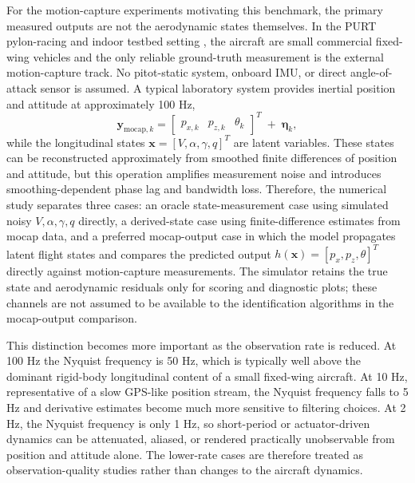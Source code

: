 \documentclass[11pt]{article}
\begin{document}
For the motion-capture experiments motivating this benchmark, the primary measured outputs are not the aerodynamic states themselves. In the PURT pylon-racing and indoor testbed setting \citep{sribunma2026indoor}, the aircraft are small commercial fixed-wing vehicles and the only reliable ground-truth measurement is the external motion-capture track. No pitot-static system, onboard IMU, or direct angle-of-attack sensor is assumed. A typical laboratory system provides inertial position and attitude at approximately 100 Hz,
\[
\mathbf{y}_{\mathrm{mocap},k} =
\begin{bmatrix}
p_{x,k} & p_{z,k} & \theta_k
\end{bmatrix}^{T}
\;+\;
\boldsymbol{\eta}_k,
\]
while the longitudinal states $\mathbf{x}=[V,\alpha,\gamma,q]^T$ are latent variables. These states can be reconstructed approximately from smoothed finite differences of position and attitude, but this operation amplifies measurement noise and introduces smoothing-dependent phase lag and bandwidth loss. Therefore, the numerical study separates three cases: an oracle state-measurement case using simulated noisy $V,\alpha,\gamma,q$ directly, a derived-state case using finite-difference estimates from mocap data, and a preferred mocap-output case in which the model propagates latent flight states and compares the predicted output $h(\mathbf{x})=[p_x,p_z,\theta]^T$ directly against motion-capture measurements. The simulator retains the true state and aerodynamic residuals only for scoring and diagnostic plots; these channels are not assumed to be available to the identification algorithms in the mocap-output comparison.

This distinction becomes more important as the observation rate is reduced. At 100 Hz the Nyquist frequency is 50 Hz, which is typically well above the dominant rigid-body longitudinal content of a small fixed-wing aircraft. At 10 Hz, representative of a slow GPS-like position stream, the Nyquist frequency falls to 5 Hz and derivative estimates become much more sensitive to filtering choices. At 2 Hz, the Nyquist frequency is only 1 Hz, so short-period or actuator-driven dynamics can be attenuated, aliased, or rendered practically unobservable from position and attitude alone. The lower-rate cases are therefore treated as observation-quality studies rather than changes to the aircraft dynamics.
\end{document}
